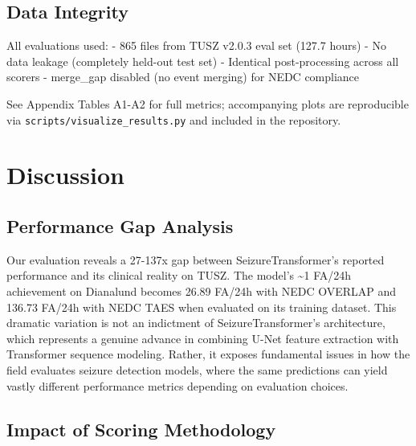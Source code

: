 \documentclass[
]{article}
\begin{document}
\hypertarget{data-integrity}{%
\subsection{Data Integrity}\label{data-integrity}}

All evaluations used: - 865 files from TUSZ v2.0.3 eval set (127.7
hours) - No data leakage (completely held-out test set) - Identical
post-processing across all scorers - merge\_gap disabled (no event
merging) for NEDC compliance

See Appendix Tables A1-A2 for full metrics; accompanying plots are
reproducible via \texttt{scripts/visualize\_results.py} and included in
the repository.

\hypertarget{discussion}{%
\section{Discussion}\label{discussion}}

\hypertarget{performance-gap-analysis}{%
\subsection{Performance Gap Analysis}\label{performance-gap-analysis}}

Our evaluation reveals a 27-137x gap between SeizureTransformer's
reported performance and its clinical reality on TUSZ. The model's
\textasciitilde1 FA/24h achievement on Dianalund becomes 26.89 FA/24h
with NEDC OVERLAP and 136.73 FA/24h with NEDC TAES when evaluated on its
training dataset. This dramatic variation is not an indictment of
SeizureTransformer's architecture, which represents a genuine advance in
combining U-Net feature extraction with Transformer sequence modeling.
Rather, it exposes fundamental issues in how the field evaluates seizure
detection models, where the same predictions can yield vastly different
performance metrics depending on evaluation choices.

\hypertarget{impact-of-scoring-methodology}{%
\subsection{Impact of Scoring
Methodology}\label{impact-of-scoring-methodology}}
\end{document}
